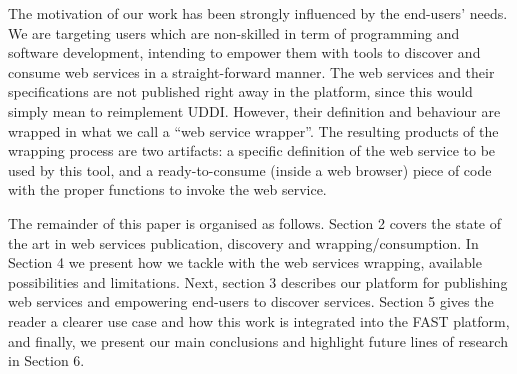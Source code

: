 The motivation of our work has been strongly influenced by the end-users' needs. We are targeting users which are non-skilled in term of programming and software development, intending to empower them with tools to discover and consume web services in a straight-forward manner.
The web services and their specifications are not published right away in the platform, since this would simply mean to reimplement UDDI.
However, their definition and behaviour are wrapped in what we call a ``web service wrapper''. The resulting products of the wrapping process are two artifacts: a specific definition of the web service to be used by this tool, and a ready-to-consume (inside a web browser) piece of code with the proper functions to invoke the web service.

The remainder of this paper is organised as follows. Section 2 covers the state of the art in web services publication, discovery and wrapping/consumption. In Section 4 we present how we tackle with the web services wrapping, available possibilities and limitations. Next, section 3 describes our platform for publishing web services and empowering end-users to discover services. Section 5 gives the reader a clearer use case and how this work is integrated into the FAST platform, and finally, we present our main conclusions and highlight future lines of research in Section 6.


